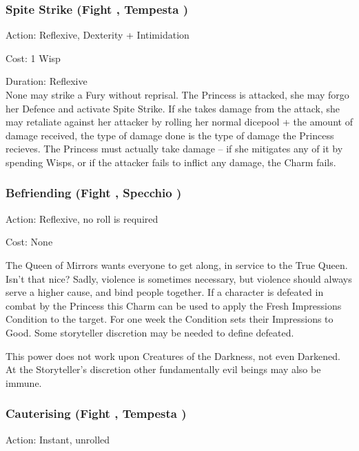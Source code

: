 \subsubsection*{Spite Strike (Fight \textbullet\textbullet, Tempesta \textbullet)}

\noindent Action: Reflexive, Dexterity + Intimidation

\noindent Cost: 1 Wisp

\noindent Duration: Reflexive\\

\noindent None may strike a Fury without reprisal. The Princess is attacked, she may forgo her Defence and activate Spite Strike. If she takes damage from the attack, she may retaliate against her attacker by rolling her normal dicepool + the amount of damage received, the type of damage done is the type of damage the Princess recieves. The Princess must actually take damage -- if she mitigates any of it by spending Wisps, or if the attacker fails to inflict any damage, the Charm fails.

\subsubsection*{Befriending (Fight \textbullet\textbullet, Specchio \textbullet\textbullet)}

\noindent Action: Reflexive, no roll is required

\noindent Cost: None

\noindent The Queen of Mirrors wants everyone to get along, in service to the True Queen. Isn't that nice? Sadly, violence is sometimes necessary, but violence should always serve a higher cause, and bind people together. If a character is defeated in combat by the Princess this Charm can be used to apply the Fresh Impressions Condition to the target. For one week the Condition sets their Impressions to Good. Some storyteller discretion may be needed to define defeated.

This power does not work upon Creatures of the Darkness, not even Darkened. At the Storyteller's discretion other fundamentally evil beings may also be immune. 

\subsubsection*{Cauterising (Fight \textbullet\textbullet, Tempesta \textbullet\textbullet\textbullet\textbullet)}

\noindent Action: Instant, unrolled

